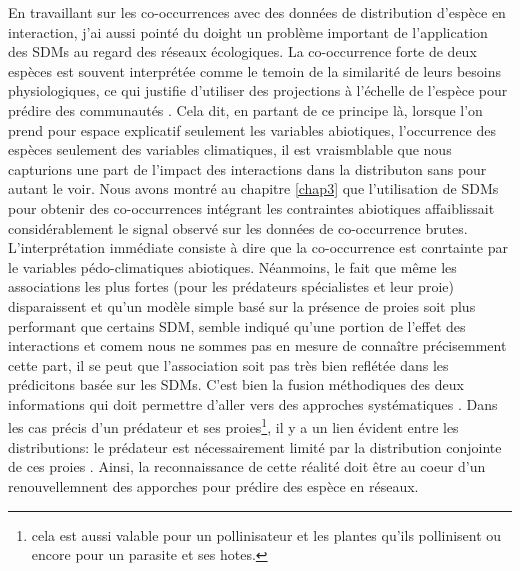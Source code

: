 En travaillant sur les co-occurrences avec des données de distribution
d'espèce en interaction, j'ai aussi pointé du doight un problème
important de l'application des SDMs au regard des réseaux écologiques.
La co-occurrence forte de deux espèces est souvent interprétée comme le
temoin de la similarité de leurs besoins physiologiques, ce qui justifie
d'utiliser des projections à l'échelle de l'espèce pour prédire des
communautés \citep{Rehfeldt2006, Albouy2012}. Cela dit, en partant de ce
principe là, lorsque l'on prend pour espace explicatif seulement les
variables abiotiques, l'occurrence des espèces seulement des variables
climatiques, il est vraismblable que nous capturions une part de
l'impact des interactions dans la distributon sans pour autant le voir.
Nous avons montré au chapitre \ref{chap3} que l'utilisation de SDMs pour
obtenir des co-occurrences intégrant les contraintes abiotiques
affaiblissait considérablement le signal observé sur les données de
co-occurrence brutes. L'interprétation immédiate consiste à dire que la
co-occurrence est conrtainte par le variables pédo-climatiques
abiotiques. Néanmoins, le fait que même les associations les plus fortes
(pour les prédateurs spécialistes et leur proie) disparaissent et qu'un
modèle simple basé sur la présence de proies soit plus performant que
certains SDM, semble indiqué qu'une portion de l'effet des interactions
et comem nous ne sommes pas en mesure de connaître précisemment cette
part, il se peut que l'association soit pas très bien reflétée dans les
prédicitons basée sur les SDMs. C'est bien la fusion méthodiques des
deux informations qui doit permettre d'aller vers des approches
systématiques \citep{Meier2010}. Dans les cas précis d'un prédateur et
ses proies\footnote{cela est aussi valable pour un pollinisateur et les
  plantes qu'ils pollinisent ou encore pour un parasite et ses hotes.},
il y a un lien évident entre les distributions: le prédateur est
nécessairement limité par la distribution conjointe de ces proies
\citep{Holt2009, Shenbrot2007}. Ainsi, la reconnaissance de cette
réalité doit être au coeur d'un renouvellemnent des apporches pour
prédire des espèce en réseaux.

